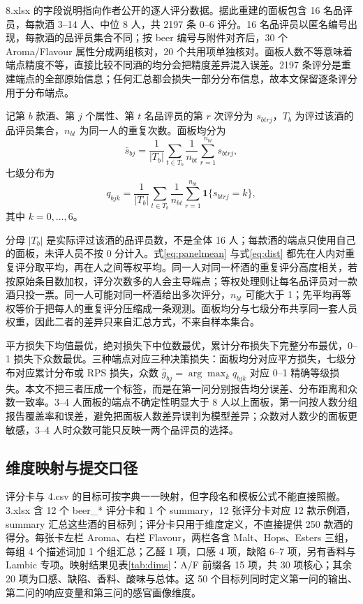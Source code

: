 8.xlsx 的字段说明指向作者公开的逐人评分数据。据此重建的面板包含 16 名品评员，每款酒 3--14 人、中位 8 人，共 2197 条 0--6 评分。16 名品评员以匿名编号出现，每款酒的品评员集合不同；按 beer 编号与附件对齐后，30 个 Aroma/Flavour 属性分成两组核对，20 个共用项单独核对。面板人数不等意味着端点精度不等，直接比较不同酒的均分会把精度差异混入误差。2197 条评分是重建端点的全部原始信息；任何汇总都会损失一部分分布信息，故本文保留逐条评分用于分布端点。

记第 $b$ 款酒、第 $j$ 个属性、第 $t$ 名品评员的第 $r$ 次评分为 $s_{btrj}$，$T_b$ 为评过该酒的品评员集合，$n_{bt}$ 为同一人的重复次数。面板均分为
\begin{equation}\label{eq:panelmean}
\bar s_{bj}=\frac{1}{|T_b|}\sum_{t\in T_b}\frac{1}{n_{bt}}\sum_{r=1}^{n_{bt}}s_{btrj},
\end{equation}
七级分布为
\begin{equation}\label{eq:dist}
q_{bjk}=\frac{1}{|T_b|}\sum_{t\in T_b}\frac{1}{n_{bt}}\sum_{r=1}^{n_{bt}}\mathbf{1}\{s_{btrj}=k\},
\end{equation}
其中 $k=0,\ldots,6$。

分母 $|T_b|$ 是实际评过该酒的品评员数，不是全体 16 人；每款酒的端点只使用自己的面板，未评人员不按 0 分计入。式\eqref{eq:panelmean} 与式\eqref{eq:dist} 都先在人内对重复评分取平均，再在人之间等权平均。同一人对同一杯酒的重复评分高度相关，若按原始条目数加权，评分次数多的人会主导端点；等权处理则让每名品评员对一款酒只投一票。同一人可能对同一杯酒给出多次评分，$n_{bt}$ 可能大于 1；先平均再等权等价于把每人的重复评分压缩成一条观测。面板均分与七级分布共享同一套人员权重，因此二者的差异只来自汇总方式，不来自样本集合。

平方损失下均值最优，绝对损失下中位数最优，累计分布损失下完整分布最优，0--1 损失下众数最优。三种端点对应三种决策损失：面板均分对应平方损失，七级分布对应累计分布或 RPS 损失，众数 $\hat g_{bj}=\arg\max_k q_{bjk}$ 对应 0--1 精确等级损失。本文不把三者压成一个标签，而是在第一问分别报告均分误差、分布距离和众数一致率。3--4 人面板的端点不确定性明显大于 8 人以上面板，第一问按人数分组报告覆盖率和误差，避免把面板人数差异误判为模型差异；众数对人数少的面板更敏感，3--4 人时众数可能只反映一两个品评员的选择。

\subsection{维度映射与提交口径}

评分卡与 4.csv 的目标可按字典一一映射，但字段名和模板公式不能直接照搬。3.xlsx 含 12 个 beer\_* 评分卡和 1 个 summary，12 张评分卡对应 12 款示例酒，summary 汇总这些酒的目标列；评分卡只用于维度定义，不直接提供 250 款酒的得分。每张卡左栏 Aroma、右栏 Flavour，两栏各含 Malt、Hops、Esters 三组，每组 4 个描述词加 1 个组汇总；乙醛 1 项，口感 4 项，缺陷 6--7 项，另有香料与 Lambic 专项。映射结果见表\ref{tab:dims}：A/F 前缀各 15 项，共 30 项核心；其余 20 项为口感、缺陷、香料、酸味与总体。这 50 个目标列同时定义第一问的输出、第二问的响应变量和第三问的感官画像维度。

